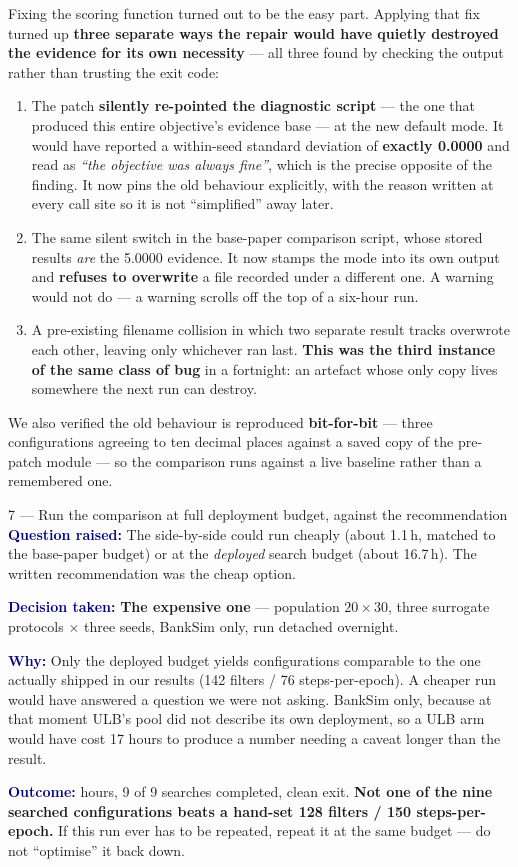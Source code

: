 \documentclass[11pt]{article}
\newcommand{\qlabel}[1]{\textbf{\textcolor{navy}{#1}}\;}
\begin{document}
Fixing the scoring function turned out to be the easy part. Applying that fix turned up \textbf{three
separate ways the repair would have quietly destroyed the evidence for its own necessity} --- all three
found by checking the output rather than trusting the exit code:

\begin{enumerate}
  \item The patch \textbf{silently re-pointed the diagnostic script} --- the one that produced this
  entire objective's evidence base --- at the new default mode. It would have reported a within-seed
  standard deviation of \textbf{exactly 0.0000} and read as \emph{``the objective was always fine''},
  which is the precise opposite of the finding. It now pins the old behaviour explicitly, with the
  reason written at every call site so it is not ``simplified'' away later.
  \item The same silent switch in the base-paper comparison script, whose stored results \emph{are} the
  5.0000 evidence. It now stamps the mode into its own output and \textbf{refuses to overwrite} a file
  recorded under a different one. A warning would not do --- a warning scrolls off the top of a six-hour run.
  \item A pre-existing filename collision in which two separate result tracks overwrote each other,
  leaving only whichever ran last. \textbf{This was the third instance of the same class of bug} in a
  fortnight: an artefact whose only copy lives somewhere the next run can destroy.
\end{enumerate}

We also verified the old behaviour is reproduced \textbf{bit-for-bit} --- three configurations agreeing
to ten decimal places against a saved copy of the pre-patch module --- so the comparison runs against a
live baseline rather than a remembered one.

\begin{decision}{7 --- Run the comparison at full deployment budget, against the recommendation}
\qlabel{Question raised:} The side-by-side could run cheaply (about 1.1\,h, matched to the base-paper
budget) or at the \emph{deployed} search budget (about 16.7\,h). The written recommendation was the
cheap option.

\qlabel{Decision taken:} \textbf{The expensive one} --- population $20\times30$, three surrogate
protocols $\times$ three seeds, BankSim only, run detached overnight.

\qlabel{Why:} Only the deployed budget yields configurations comparable to the one actually shipped in
our results (142 filters / 76 steps-per-epoch). A cheaper run would have answered a question we were not
asking. BankSim only, because at that moment ULB's pool did not describe its own deployment, so a ULB arm
would have cost 17 hours to produce a number needing a caveat longer than the result.

\qlabel{Outcome:} 16.3 hours, 9 of 9 searches completed, clean exit. \textbf{Not one of the nine
searched configurations beats a hand-set 128 filters / 150 steps-per-epoch.} If this run ever has to be
repeated, repeat it at the same budget --- do not ``optimise'' it back down.
\end{decision}
\end{document}
